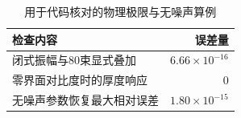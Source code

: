 \begin{table}[htbp]\centering
\caption{用于代码核对的物理极限与无噪声算例}\label{tab:physical-checks}
\begin{tabular}{lr}
\toprule
检查内容 & 误差量\\\midrule
闭式振幅与80束显式叠加 & $6.66\times10^{-16}$\\
零界面对比度时的厚度响应 & 0\\
无噪声参数恢复最大相对误差 & $1.80\times10^{-15}$\\
\bottomrule
\end{tabular}\end{table}
